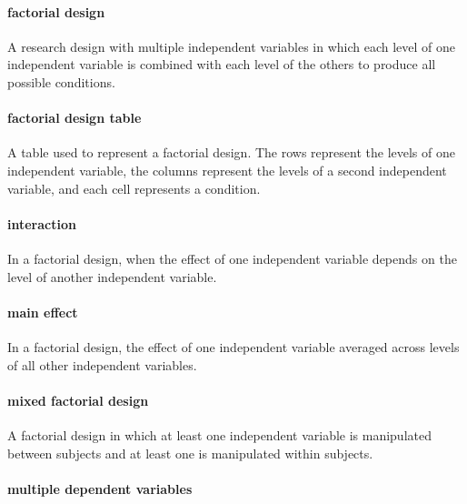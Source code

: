 \documentclass[
]{krantz}
\begin{document}
\paragraph*{factorial design}\label{factorial-design}

A research design with multiple independent variables in which each level of one independent variable is combined with each level of the others to produce all possible conditions.

\paragraph*{factorial design table}\label{factorial-design-table}

A table used to represent a factorial design. The rows represent the levels of one independent variable, the columns represent the levels of a second independent variable, and each cell represents a condition.

\paragraph*{interaction}\label{interaction}

In a factorial design, when the effect of one independent variable depends on the level of another independent variable.

\paragraph*{main effect}\label{main-effect}

In a factorial design, the effect of one independent variable averaged across levels of all other independent variables.

\paragraph*{mixed factorial design}\label{mixed-factorial-design}

A factorial design in which at least one independent variable is manipulated between subjects and at least one is manipulated within subjects.

\paragraph*{multiple dependent variables}\label{multiple-dependent-variables-1}
\end{document}
